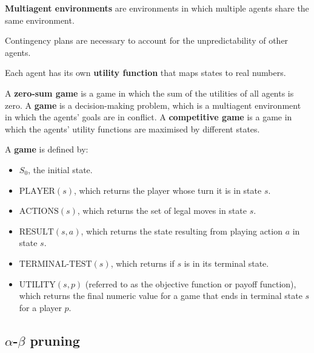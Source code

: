
\begin{definition}
    \textbf{Multiagent environments} are environments in which multiple agents share the same environment.
\end{definition}

Contingency plans are necessary to account for the unpredictability of other agents.

\begin{definition}
    Each agent has its own \textbf{utility function} that maps states to real numbers.
\end{definition}

\begin{definition}
    A \textbf{zero-sum game} is a game in which the sum of the utilities of all agents is zero. A \textbf{game} is a decision-making problem, which is a multiagent environment in which the agents' goals are in conflict. A \textbf{competitive game} is a game in which the agents' utility functions are maximised by different states.
\end{definition}

\begin{definition}
    A \textbf{game} is defined by:

    \begin{itemize}
        \item $S_{0}$, the initial state.
        \item $\text{PLAYER}(s)$, which returns the player whose turn it is in state $s$.
        \item $\text{ACTIONS}(s)$, which returns the set of legal moves in state $s$.
        \item $\text{RESULT}(s, a)$, which returns the state resulting from playing action $a$ in state $s$.
        \item $\text{TERMINAL-TEST}(s)$, which returns if $s$ is in its terminal state.
        \item $\text{UTILITY}(s, p)$ (referred to as the objective function or payoff function), which returns the final numeric value for a game that ends in terminal state $s$ for a player $p$.
    \end{itemize}
\end{definition}

\subsection{$\alpha$-$\beta$ pruning}
\label{sub_sec:alpha_beta_pruning}

